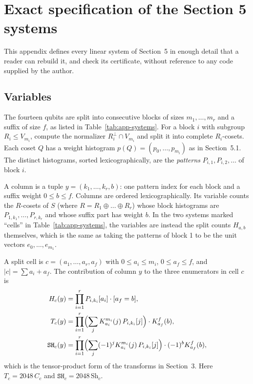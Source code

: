 \documentclass[11pt]{article}
\newcommand{\Sh}{\mathrm{Sh}}
\begin{document}
\appendix
\section{Exact specification of the Section 5 systems}\label{app:systems}

This appendix defines every linear system of Section~5 in enough detail that a reader can rebuild it, and check its certificate, without reference to any code supplied by the author.

\subsection{Variables}\label{app:variables}

The fourteen qubits are split into consecutive blocks of sizes \(m_1,\dots,m_r\) and a suffix of size \(f\), as listed in Table~\ref{tab:app-systems}. For a block \(i\) with subgroup \(R_i\leq V_{m_i}\), compute the normalizer \(R_i^\perp\cap V_{m_i}\) and split it into complete \(R_i\)-cosets. Each coset \(Q\) has a weight histogram \(p(Q)=(p_0,\dots,p_{m_i})\) as in Section~5.1. The distinct histograms, sorted lexicographically, are the \emph{patterns} \(P_{i,1},P_{i,2},\dots\) of block \(i\).

A column is a tuple \(y=(k_1,\dots,k_r,b)\): one pattern index for each block and a suffix weight \(0\leq b\leq f\). Columns are ordered lexicographically. Its variable counts the \(R\)-cosets of \(S\) (where \(R=R_1\oplus\dots\oplus R_r\)) whose block histograms are \(P_{1,k_1},\dots,P_{r,k_r}\) and whose suffix part has weight \(b\). In the two systems marked ``cells'' in Table~\ref{tab:app-systems}, the variables are instead the split counts \(H_{a,b}\) themselves, which is the same as taking the patterns of block 1 to be the unit vectors \(e_0,\dots,e_{m_1}\).

A split cell is \(c=(a_1,\dots,a_r,a_f)\) with \(0\leq a_i\leq m_i\), \(0\leq a_f\leq f\), and \(|c|=\sum a_i+a_f\). The contribution of column \(y\) to the three enumerators in cell \(c\) is
\[
\begin{aligned}
H_c(y)&=\prod_{i=1}^r P_{i,k_i}[a_i]\cdot[a_f=b],\\
T_c(y)&=\prod_{i=1}^r\Bigl(\sum_{j}K^{m_i}_{a_i}(j)\,P_{i,k_i}[j]\Bigr)\cdot K^{f}_{a_f}(b),\\
\mathtt{SH}_c(y)&=\prod_{i=1}^r\Bigl(\sum_{j}(-1)^jK^{m_i}_{a_i}(j)\,P_{i,k_i}[j]\Bigr)\cdot(-1)^bK^{f}_{a_f}(b),
\end{aligned}
\]
which is the tensor-product form of the transforms in Section~3. Here \(T_c=2048\,C_c\) and \(\mathtt{SH}_c=2048\,\Sh_c\).
\end{document}
